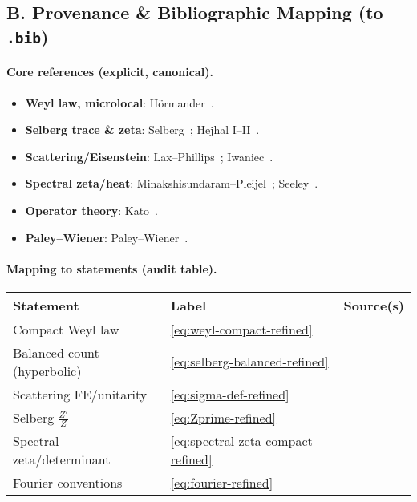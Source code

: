 \subsection*{B. Provenance \& Bibliographic Mapping (to \texttt{.bib})}
\label{subsec:provenance-refined}

\paragraph{Core references (explicit, canonical).}
\begin{itemize}
  \item \textbf{Weyl law, microlocal}: Hörmander~\cite{Hormander1968}.
  \item \textbf{Selberg trace \& zeta}: Selberg~\cite{Selberg1956}; Hejhal I–II~\cite{Hejhal1983,Hejhal1983II}.
  \item \textbf{Scattering/Eisenstein}: Lax–Phillips~\cite{LaxPhillips1976}; Iwaniec~\cite{Iwaniec2002}.
  \item \textbf{Spectral zeta/heat}: Minakshisundaram–Pleijel~\cite{Minakshisundaram1949}; Seeley~\cite{Seeley1967}.
  \item \textbf{Operator theory}: Kato~\cite{Kato}.
  \item \textbf{Paley–Wiener}: Paley–Wiener~\cite{PaleyWiener1934}.
\end{itemize}

\paragraph{Mapping to statements (audit table).}
\begin{center}
\renewcommand{\arraystretch}{1.15}
\begin{tabular}{lll}
\toprule
\textbf{Statement} & \textbf{Label} & \textbf{Source(s)} \\
\midrule
Compact Weyl law & \eqref{eq:weyl-compact-refined} & \cite{Hormander1968} \\
Balanced count (hyperbolic) & \eqref{eq:selberg-balanced-refined} & \cite{Selberg1956,Hejhal1983,Hejhal1983II,LaxPhillips1976} \\
Scattering FE/unitarity & \eqref{eq:sigma-def-refined} & \cite{Hejhal1983II,LaxPhillips1976} \\
Selberg $\frac{Z'}{Z}$ & \eqref{eq:Zprime-refined} & \cite{Selberg1956,Hejhal1983,Hejhal1983II} \\
Spectral zeta/determinant & \eqref{eq:spectral-zeta-compact-refined} & \cite{Minakshisundaram1949,Seeley1967} \\
Fourier conventions & \eqref{eq:fourier-refined} & \cite{PaleyWiener1934} \\
\bottomrule
\end{tabular}
\end{center}

